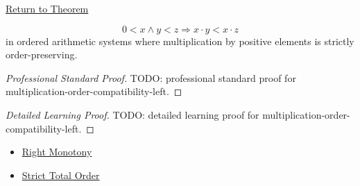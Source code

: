 \newpage
{}
\label{prf:multiplication-order-compatibility-left}

\begin{remark*}[Return]
\hyperref[prop:multiplication-order-compatibility-left]{Return to Theorem}
\end{remark*}

\begin{proposition*}
\[
0<x \land y<z \Longrightarrow x\cdot y<x\cdot z
\]
in ordered arithmetic systems where multiplication by positive elements is
strictly order-preserving.
\end{proposition*}

\begin{proof}[Professional Standard Proof]
\LRAProofBodyStart
TODO: professional standard proof for multiplication-order-compatibility-left.
\end{proof}

\begin{proof}[Detailed Learning Proof]
\LRAProofBodyStart
TODO: detailed learning proof for multiplication-order-compatibility-left.
\end{proof}

\begin{remark*}
\end{remark*}

\begin{dependencies}
\begin{itemize}
  \item \hyperref[def:right-monotony]{Right Monotony}
  \item \hyperref[def:strict-total-order]{Strict Total Order}
\end{itemize}
\end{dependencies}

\clearpage
